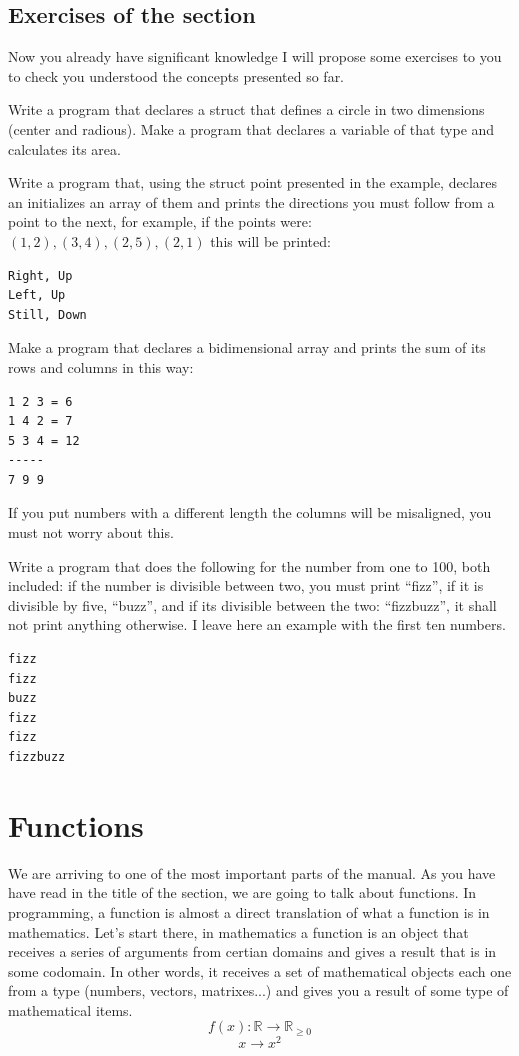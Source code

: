 \documentclass[a4paper]{article}
\begin{document}
\subsection{Exercises of the section}
Now you already have significant knowledge I will propose some exercises to you
to check you understood the concepts presented so far.
\begin{exercises}
\item Write a program that declares a struct that defines a circle in two
dimensions (center and radious). Make a program that declares a variable of
that type and calculates its area.
\item Write a program that, using the struct point presented in the example,
declares an initializes an array of them and prints the directions you must
follow from a point to the next, for example, if the points were:
$(1, 2), (3, 4), (2, 5), (2, 1)$ this will be printed:
\begin{verbatim}
Right, Up
Left, Up
Still, Down
\end{verbatim}

\item Make a program that declares a bidimensional array and prints the
sum of its rows and columns in this way:

\begin{verbatim}
1 2 3 = 6
1 4 2 = 7
5 3 4 = 12
-----
7 9 9

\end{verbatim}

If you put numbers with a different length the columns will be
misaligned, you must not worry about this.

\item Write a program that does the following for the number from one to 100,
both included: if the number is divisible between two, you must print ``fizz'',
if it is divisible by five, ``buzz'', and if its divisible between the two:
``fizzbuzz'', it shall not print anything otherwise.
I leave here an example with the first ten numbers.
\begin{verbatim}
fizz
fizz
buzz
fizz
fizz
fizzbuzz
\end{verbatim}
\end{exercises}

\section{Functions}
\label{funciones}
We are arriving to one of the most important parts of the manual. As you have
have read in the title of the section, we are going to talk about functions.
In programming, a function is almost a direct translation of what a function
is in mathematics. Let's start there, in mathematics a function is an object
that receives a series of arguments from certian domains and gives a result
that is in some codomain. In other words, it receives a set of mathematical
objects each one from a type (numbers, vectors, matrixes...) and gives you a
result of some type of mathematical items.
$$
f(x) : \mathbb{R} \longrightarrow \mathbb{R}_{\ge 0}
$$
$$
x \to x^2
$$
\end{document}
